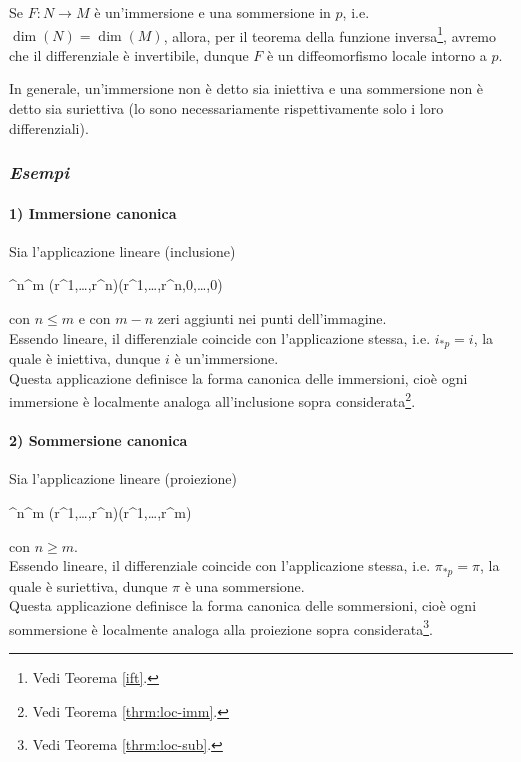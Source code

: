 \begin{remark}
	Se $ F : N \to M $ è un'immersione e una sommersione in $ p $, i.e. $ \dim(N) = \dim(M) $, allora, per il teorema della funzione inversa\footnote{%
		Vedi Teorema \ref{ift}.%
	}, avremo che il differenziale è invertibile, dunque $ F $ è un diffeomorfismo locale intorno a $ p $.
\end{remark}

\begin{remark}
	In generale, un'immersione non è detto sia iniettiva e una sommersione non è detto sia suriettiva (lo sono necessariamente rispettivamente solo i loro differenziali).
\end{remark}

\subsubsection{\textit{Esempi}}

\paragraph{1) Immersione canonica}

Sia l'applicazione lineare (inclusione)

	{\R^{n}}{\R^{m}}
	{(r^{1},\dots,r^{n})}{(r^{1},\dots,r^{n},0,\dots,0)}

con $ n \leqslant m $ e con $ m-n $ zeri aggiunti nei punti dell'immagine.\\
Essendo lineare, il differenziale coincide con l'applicazione stessa, i.e. $ i_{*p} = i $, la quale è iniettiva, dunque $ i $ è un'immersione.\\
Questa applicazione definisce la forma canonica delle immersioni, cioè ogni immersione è localmente analoga all'inclusione sopra considerata\footnote{%
	Vedi Teorema \ref{thrm:loc-imm}.%
}.

\paragraph{2) Sommersione canonica}

Sia l'applicazione lineare (proiezione)

\map{\pi}
	{\R^{n}}{\R^{m}}
	{(r^{1},\dots,r^{n})}{(r^{1},\dots,r^{m})}

con $ n \geqslant m $.\\
Essendo lineare, il differenziale coincide con l'applicazione stessa, i.e. $ \pi_{*p} = \pi $, la quale è suriettiva, dunque $ \pi $ è una sommersione.\\
Questa applicazione definisce la forma canonica delle sommersioni, cioè ogni sommersione è localmente analoga alla proiezione sopra considerata\footnote{%
	Vedi Teorema \ref{thrm:loc-sub}.%
}.

